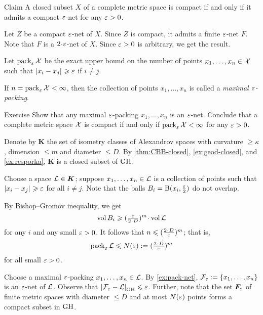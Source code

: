 \begin{thm}{Claim}\label{clm:compact-net}
A closed subset $X$ of a complete metric space is compact if and only if it admits a compact $\varepsilon$-net for any $\varepsilon>0$.
\end{thm}

Let $Z$ be a compact $\varepsilon$-net of $X$.
Since $Z$ is compact, it admits a finite $\varepsilon$-net $F$.
Note that $F$ is a $2\cdot\eps$-net of $X$.
Since $\varepsilon>0$ is arbitrary, we get the result.
\qeds

Let $\operatorname{\rm pack}\nolimits_\varepsilon\mathcal{X}$ be the exact upper bound on the number of points $x_1,\z\dots,x_n\in \spc{X}$ such that $\dist{x_i}{x_j}{}\ge\eps$ if $i\ne j$.

If $n=\operatorname{\rm pack}\nolimits_\varepsilon\mathcal{X}<\infty$, then
the collection of points $x_1,\dots,x_n$ is called a \emph{maximal $\varepsilon$-packing}.

\begin{thm}{Exercise}\label{ex:pack-net}
Show that any maximal $\varepsilon$-packing $x_1,\dots,x_n$ is an $\varepsilon$-net.
Conclude that a complete metric space $\mathcal{X}$ is compact if and only if $\pack_\eps\spc{X}\z<\infty$ for any $\varepsilon>0$.
\end{thm}


Denote by $\bm{K}$ the set of isometry classes of Alexandrov spaces with curvature $\ge \kappa$, dimension $\le m$ and diameter $\le D$.
By \ref{thm:CBB-closed}, \ref{ex:geod-closed}, and \ref{ex:resporka}, $\bm{K}$ is a closed subset of $\operatorname{\rm GH}\nolimits$.

Choose a space $\mathcal{L}\in \bm{K}$;
suppose $x_1,\dots,x_n\in \mathcal{L}$ is a collection of points such that $\dist{x_i}{x_j}{}\ge \eps$ for all $i\ne j$.
Note that the balls $B_i=\mathrm{B}{}(x_i,\tfrac{\varepsilon}2)$ do not overlap.

By Bishop--Gromov inequality, we get 
\[\vol B_i\ge (\tfrac\eps{2\cdot D})^m\cdot\vol \spc{L}\]
for any $i$ and any small $\varepsilon>0$.
It follows that $n\le (\tfrac{2\cdot D}\eps)^m$;
that is, 
\[\pack_\eps\spc{L}\le  N(\eps)\df(\tfrac{2\cdot D}\eps)^m\]
for all small $\varepsilon>0$.

Choose a maximal $\varepsilon$-packing $x_1,\z\dots,x_n\in \spc{L}$.
By \ref{ex:pack-net}, $\spc{F}_\eps\z\df\{x_1,\z\dots,x_n\}$ is an $\varepsilon$-net of $\mathcal{L}$.
Observe that $\dist{\spc{F}_\eps}{\spc{L}}{\GH}\le \eps$.
Further, note that the set $\bm{F}_\varepsilon$ of finite metric spaces with diameter $\le D$ and at most $N(\varepsilon)$ points forms a compact subset in $\operatorname{\rm GH}\nolimits$.

